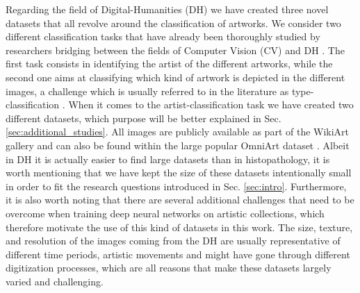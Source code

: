 Regarding the field of Digital-Humanities (DH) we have created three novel datasets that all revolve around the classification of artworks. We consider two different classification tasks that have already been thoroughly studied by researchers bridging between the fields of Computer Vision (CV) and DH \cite{mensink2014rijksmuseum,strezoski2017omniart,sabatelli2018deep}. The first task consists in identifying the artist of the different artworks, while the second one aims at classifying which kind of artwork is depicted in the different images, a challenge which is usually referred to in the literature as type-classification \cite{mensink2014rijksmuseum,sabatelli2018deep}. When it comes to the artist-classification task we have created two different datasets, which purpose will be better explained in Sec. \ref{sec:additional_studies}. All images are publicly available as part of the WikiArt gallery \cite{phillips2011wiki} and can also be found within the large popular OmniArt dataset \cite{strezoski2018omniart}. Albeit in DH it is actually easier to find large datasets than in histopathology, it is worth mentioning that we have kept the size of these datasets intentionally small in order to fit the research questions introduced in Sec. \ref{sec:intro}. Furthermore, it is also worth noting that there are several additional challenges that need to be overcome when training deep neural networks on artistic collections, which therefore motivate the use of this kind of datasets in this work. The size, texture, and resolution of the images coming from the DH are usually representative of different time periods, artistic movements and might have gone through different digitization processes, which are all reasons that make these datasets largely varied and challenging.



